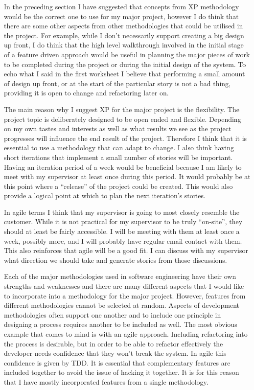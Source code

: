 \documentclass[paper=a4, fontsize=11pt]{scrartcl}	%
\numberwithin{equation}{section} %
\numberwithin{figure}{section} %
\numberwithin{table}{section}
\begin{document}
In the preceding section I have suggested that concepts from XP methodology would be the correct one to use for my major project, however I do think that there are some other aspects from other methodologies that could be utilised in the project. For example, while I don't necessarily support creating a big design up front, I do think that the high level walkthrough involved in the initial stage of a feature driven approach would be useful in planning the major pieces of work to be completed during the project or during the initial design of the system. To echo what I said in the first worksheet I believe that performing a small amount of design up front, or at the start of the particular story is not a bad thing, providing it is open to change and refactoring later on.

The main reason why I suggest XP for the major project is the flexibility. The project topic is deliberately designed to be open ended and flexible. Depending on my own tastes and interests as well as what results we see as the project progresses will influence the end result of the project. Therefore I think that it is essential to use a methodology that can adapt to change. I also think having short iterations that implement a small number of stories will be important. Having an iteration period of a week would be beneficial because I am likely to meet with my supervisor at least once during this period. It would probably be at this point where a ``release'' of the project could be created. This would also provide a logical point at which to plan the next iteration's stories.

In agile terms I think that my supervisor is going to most closely resemble the customer. While it is not practical for my supervisor to be truly ``on-site'', they should at least be fairly accessible. I will be meeting with them at least once a week, possibly more, and I will probably have regular email contact with them. This also reinforces that agile will be a good fit. I can discuss with my supervisor what direction we should take and generate stories from those discussions.

Each of the major methodologies used in software engineering have their own strengths and weaknesses and there are many different aspects that I would like to incorporate into a methodology for the major project. However, features from different methodologies cannot be selected at random. Aspects of development methodologies often support one another and to include one principle in designing a process requires another to be included as well. The most obvious example that comes to mind is with an agile approach. Including refactoring into the process is desirable, but in order to be able to refactor effectively the developer needs confidence that they won't break the system. In agile this confidence is given by TDD. It is essential that complementary features are included together to avoid the issue of hacking it together. It is for this reason that I have mostly incorporated features from a single methodology.
\end{document}
